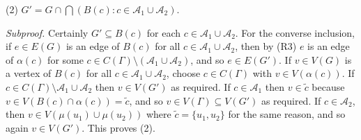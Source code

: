 \hspace*{12pt}(2) $G' = G \cap \bigcap(B(c) : c \in \mathcal{A}_1 \cup \mathcal{A}_2)$.

\textit{Subproof.} Certainly $G' \subseteq B(c)$ for each $c \in \mathcal{A}_1 \cup \mathcal{A}_2$. For the converse inclusion, if $e \in E(G)$ is an edge of $B(c)$ for all $c \in \mathcal{A}_1 \cup \mathcal{A}_2$, then by (R3) $e$ is an edge of $\alpha(c)$ for some $c \in C(\Gamma) \setminus (\mathcal{A}_1 \cup \mathcal{A}_2)$, and so $e \in E(G')$. If $v \in V(G)$ is a vertex of $B(c)$ for all $c \in \mathcal{A}_1 \cup \mathcal{A}_2$, choose $c \in C(\Gamma)$ with $v \in V(\alpha(c))$. If $c \in C(\Gamma) \setminus \mathcal{A}_1 \cup \mathcal{A}_2$ then $v \in V(G')$ as required. If $c \in \mathcal{A}_1$ then $v \in \tilde{c}$ because $v \in V(B(c) \cap \alpha(c)) = \tilde{c}$, and so $v \in V(\Gamma) \subseteq V(G')$ as required. If $c \in \mathcal{A}_2$, then $v \in V(\mu(u_1) \cup \mu(u_2))$ where $\tilde{c} = \{u_1, u_2\}$ for the same reason, and so again $v \in V(G')$. This proves (2).
